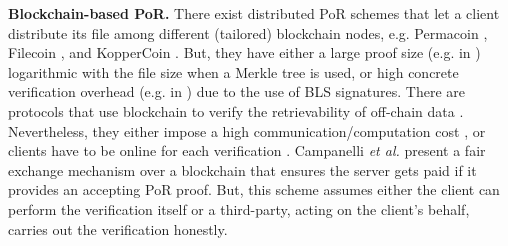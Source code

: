 \vspace{-1mm}
\noindent\textbf{Blockchain-based PoR.} There exist distributed PoR schemes that let a client  distribute its file among different (tailored) blockchain nodes,  e.g. Permacoin \cite{MillerPermacoin}, Filecoin  \cite{Filecoin}, and KopperCoin \cite{KoppBK16}. But,  they have either a large proof size (e.g. in \cite{MillerPermacoin,Filecoin})  logarithmic with the  file size when a  Merkle tree is used, or high concrete verification overhead (e.g. in \cite{KoppBK16}) due to the use of BLS signatures. There are protocols that use blockchain to verify the retrievability of off-chain data \cite{RennerMK18,HaoXWJW18,ZhangDLZ18,Audita18,blockchain-data-audit-18,sia14}. Nevertheless, they either impose a high communication/computation cost \cite{RennerMK18,HaoXWJW18,Audita18,blockchain-data-audit-18,sia14}, or  clients have to be online for each verification  \cite{ZhangDLZ18}.  Campanelli \textit{et al.}  \cite{CampanelliGGN17}  present a fair exchange mechanism over a blockchain that ensures the server gets paid if it provides an accepting PoR proof. But, this scheme assumes either the client can   perform the verification itself or a third-party, acting on the client's behalf,  carries out the verification honestly. 

\vspace{-2mm}










